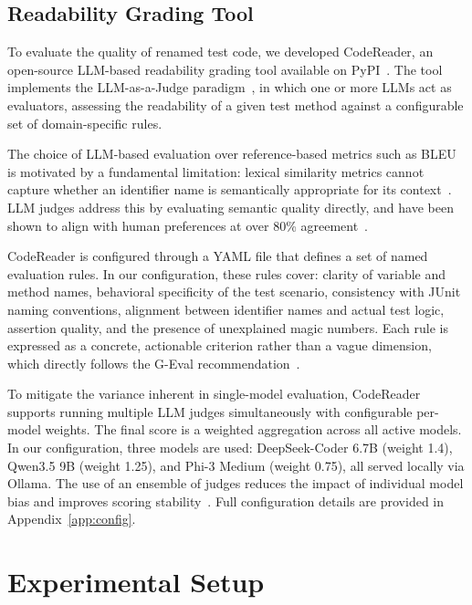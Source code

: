 \documentclass[conference]{IEEEtran}
\begin{document}
\subsection{Readability Grading Tool}

To evaluate the quality of renamed test code, we developed CodeReader, an
open-source LLM-based readability grading tool available on
PyPI~\cite{liu2025codereader}.
The tool implements the LLM-as-a-Judge
paradigm~\cite{zheng2023judging}, in which one or more LLMs act as evaluators,
assessing the readability of a given test method against a configurable set of
domain-specific rules.

The choice of LLM-based evaluation over reference-based metrics such as BLEU
is motivated by a fundamental limitation: lexical similarity metrics cannot
capture whether an identifier name is semantically appropriate for its
context~\cite{callisonburch2006bleu,papineni2002bleu,evtikhiev2023bleu}.
LLM judges address this by evaluating semantic quality directly, and have been
shown to align with human preferences at over 80\%
agreement~\cite{zheng2023judging}.

CodeReader is configured through a YAML file that defines a set of named
evaluation rules.
In our configuration, these rules cover: clarity of variable and method names,
behavioral specificity of the test scenario, consistency with JUnit naming
conventions, alignment between identifier names and actual test logic,
assertion quality, and the presence of unexplained magic numbers.
Each rule is expressed as a concrete, actionable criterion rather than a vague
dimension, which directly follows the G-Eval
recommendation~\cite{liu2023geval}.

To mitigate the variance inherent in single-model evaluation, CodeReader
supports running multiple LLM judges simultaneously with configurable per-model
weights.
The final score is a weighted aggregation across all active models.
In our configuration, three models are used: DeepSeek-Coder 6.7B (weight 1.4),
Qwen3.5 9B (weight 1.25), and Phi-3 Medium (weight 0.75), all served locally
via Ollama.
The use of an ensemble of judges reduces the impact of individual model bias
and improves scoring stability~\cite{verga2024poll}.
Full configuration details are provided in Appendix~\ref{app:config}.

\section{Experimental Setup}
\end{document}
